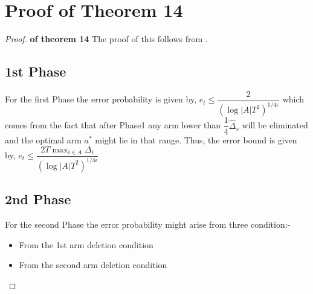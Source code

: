 \section{Proof of Theorem 14}
\begin{proof}\textbf{of theorem 14}
The proof of this follows from \citep{auer2010ucb}.
\subsection{1st Phase}
For the first Phase the error probability is given by,
\newline
\hspace*{8em}$e_{t}\leq \dfrac{2}{(\log |A|T^{2})^{1/4\epsilon}}$
\newline which comes from the fact that after Phase1 any arm lower than $\dfrac{1}{4}{\hat{\Delta}}_{s}$ will be eliminated and the optimal arm $a^{*}$ might lie in that range.
\newline
Thus, the error bound is given by,
\newline
\hspace*{8em}$e_{t}\leq \dfrac{2T\max_{i\in A}{\Delta_{i}}}{(\log |A|T^{2})^{1/4\epsilon}}$
\subsection{2nd Phase}
For the second Phase the error probability might arise from three condition:-
\begin{itemize}
\item From the 1st arm deletion condition
\item From the second arm deletion condition
\end{itemize}

\end{proof}
